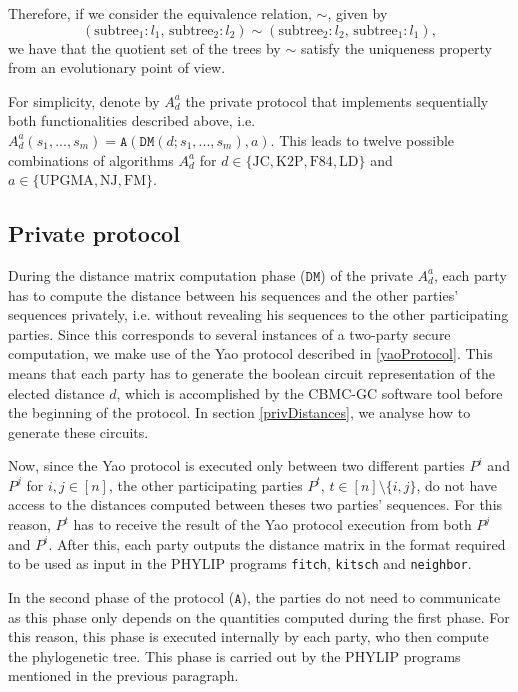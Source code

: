 \begin{itemize}
    Therefore, if we consider the equivalence relation, $\sim$, given by
    \begin{equation*}
    (\text{subtree}_1:l_1,\, \text{subtree}_2:l_2)  \sim (\text{subtree}_2:l_2,\, \text{subtree}_1:l_1),
    \end{equation*}
	we have that the quotient set of the trees by $\sim$ satisfy the uniqueness property from an evolutionary point of view.

   
\end{itemize}

For simplicity, denote by $A_d^a$ the private protocol that implements sequentially both functionalities described above, i.e. $A_d^a(s_1, ... , s_m) = \mathtt{A}( \mathtt{DM}(d; s_1, ..., s_m), a)$. This leads to twelve possible combinations of algorithms $A_d^a$ for $d\in\{\text{JC}, \text{K2P}, \text{F84}, \text{LD}\}$ and $a \in \{\text{UPGMA}, \text{NJ}, \text{FM}\}$.

\subsection{Private protocol}

During the distance matrix computation phase ($\mathtt{DM}$) of the private $A_d^a$, each party has to compute the distance between his sequences and the other parties' sequences privately, i.e. without revealing his sequences to the other participating parties. Since this corresponds to several instances of a two-party secure computation, we make use of the Yao protocol described in \ref{yaoProtocol}. This means that each party has to generate the boolean circuit representation of the elected distance $d$, which is accomplished by the CBMC-GC software tool before the beginning of the protocol. In section \ref{privDistances}, we analyse how to generate these circuits.

Now, since the Yao protocol is executed only between two different parties $P^i$ and $P^j$ for $i, j \in[n]$, the other participating parties $P^t$, $t\in[n]\setminus \{i,j\}$, do not have access to the distances computed between theses two parties' sequences. For this reason, $P^t$ has to receive the result of the Yao protocol execution from both $P^j$ and $P^i$. After this, each party outputs the distance matrix in the format required to be used as input in the PHYLIP programs \texttt{fitch}, \texttt{kitsch} and \texttt{neighbor}. 

In the second phase of the protocol ($\mathtt{A}$), the parties do not need to communicate as this phase only depends on the quantities computed during the first phase. For this reason, this phase is executed internally by each party, who then compute the phylogenetic tree. This phase is carried out by the PHYLIP programs mentioned in the previous paragraph.

